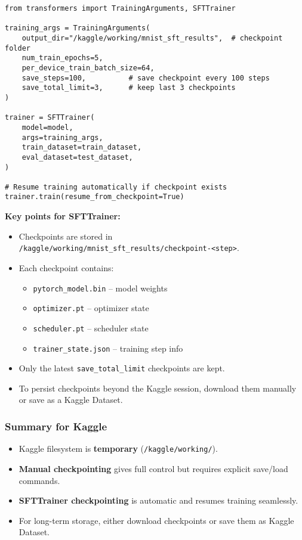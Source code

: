 \begin{tcolorbox}[colback=yellow!5!white, colframe=yellow!75!black, title=Example: SFTTrainer Automatic Checkpointing]
\begin{verbatim}
from transformers import TrainingArguments, SFTTrainer

training_args = TrainingArguments(
    output_dir="/kaggle/working/mnist_sft_results",  # checkpoint folder
    num_train_epochs=5,
    per_device_train_batch_size=64,
    save_steps=100,          # save checkpoint every 100 steps
    save_total_limit=3,      # keep last 3 checkpoints
)

trainer = SFTTrainer(
    model=model,
    args=training_args,
    train_dataset=train_dataset,
    eval_dataset=test_dataset,
)

# Resume training automatically if checkpoint exists
trainer.train(resume_from_checkpoint=True)
\end{verbatim}
\end{tcolorbox}

\textbf{Key points for SFTTrainer:}
\begin{itemize}
    \item Checkpoints are stored in \texttt{/kaggle/working/mnist\_sft\_results/checkpoint-\textless step\textgreater}.
    \item Each checkpoint contains:
    \begin{itemize}
        \item \texttt{pytorch\_model.bin} – model weights
        \item \texttt{optimizer.pt} – optimizer state
        \item \texttt{scheduler.pt} – scheduler state
        \item \texttt{trainer\_state.json} – training step info
    \end{itemize}
    \item Only the latest \texttt{save\_total\_limit} checkpoints are kept.
    \item To persist checkpoints beyond the Kaggle session, download them manually or save as a Kaggle Dataset.
\end{itemize}

\subsubsection{Summary for Kaggle}
\begin{tcolorbox}[colback=blue!5!white, colframe=blue!75!black, title=Summary]
\begin{itemize}
    \item Kaggle filesystem is \textbf{temporary} (\texttt{/kaggle/working/}).
    \item \textbf{Manual checkpointing} gives full control but requires explicit save/load commands.
    \item \textbf{SFTTrainer checkpointing} is automatic and resumes training seamlessly.
    \item For long-term storage, either download checkpoints or save them as Kaggle Dataset.
\end{itemize}
\end{tcolorbox}


